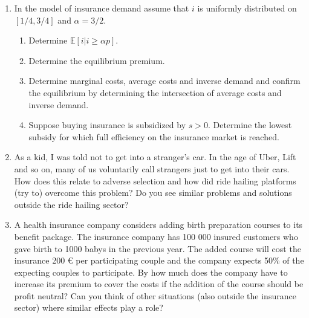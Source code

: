 \documentclass[a4paper,12pt]{article}
\begin{document}
\begin{enumerate}
\item In the model of insurance demand assume that $i$ is uniformly distributed on $[1/4,3/4]$ and $\alpha=3/2$.
  \begin{enumerate}
  \item Determine $\mathbb{E}[i|i\geq\alpha p]$.
  \item Determine the equilibrium premium.
  \item Determine marginal costs, average costs and inverse demand and confirm the equilibrium by determining the intersection of average costs and inverse demand.
    \item Suppose buying insurance is subsidized by $s>0$. Determine the lowest subsidy for which full efficiency on the insurance market is reached.
    \end{enumerate}
  \item As a kid, I was told not to get into a stranger's car. In the age of Uber, Lift and so on, many of us voluntarily call strangers just to get into their cars. How does this relate to adverse selection and how did ride hailing platforms (try to) overcome this problem? Do you see similar problems and solutions outside the ride hailing sector?
  \item A health insurance company considers adding birth preparation courses to its benefit package. The insurance company has 100 000 insured customers who gave birth to 1000 babys in the previous year. The added course will cost the insurance 200 € per participating couple and the company expects  50\% of the expecting couples to participate. By how much does the company have to increase its premium to cover the costs if the addition of the course should be profit neutral? Can you think of other situations (also outside the insurance sector) where similar effects play a role?\\

\end{enumerate}
\end{document}
